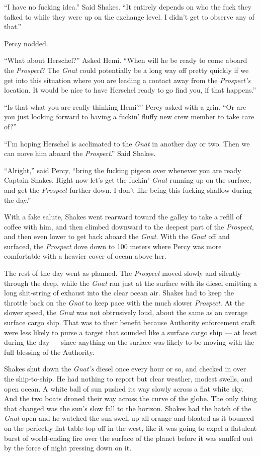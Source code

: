 \documentclass[]{scrbook}
\begin{document}
``I have no fucking idea.'' Said Shakes. ``It entirely depends on who
the fuck they talked to while they were up on the exchange level. I
didn't get to observe any of that.''

Percy nodded.

``What about Herschel?'' Asked Hemi. ``When will he be ready to come
aboard the \emph{Prospect}? The \emph{Gnat} could potentially be a long
way off pretty quickly if we get into this situation where you are
leading a contact away from the \emph{Prospect's} location. It would be
nice to have Herschel ready to go find you, if that happens.''

``Is that what you are really thinking Hemi?'' Percy asked with a grin.
``Or are you just looking forward to having a fuckin' fluffy new crew
member to take care of?''

``I'm hoping Herschel is acclimated to the \emph{Gnat} in another day or
two. Then we can move him aboard the \emph{Prospect}.'' Said Shakes.

``Alright,'' said Percy, ``bring the fucking pigeon over whenever you
are ready Captain Shakes. Right now let's get the fuckin' \emph{Gnat}
running up on the surface, and get the \emph{Prospect} further down. I
don't like being this fucking shallow during the day.''

With a fake salute, Shakes went rearward toward the galley to take a
refill of coffee with him, and then climbed downward to the deepest part
of the \emph{Prospect}, and then even lower to get back aboard the
\emph{Gnat}. With the \emph{Gnat} off and surfaced, the \emph{Prospect}
dove down to 100 meters where Percy was more comfortable with a heavier
cover of ocean above her.

The rest of the day went as planned. The \emph{Prospect} moved slowly
and silently through the deep, while the \emph{Gnat} ran just at the
surface with its diesel emitting a long shit-string of exhaust into the
clear ocean air. Shakes had to keep the throttle back on the \emph{Gnat}
to keep pace with the much slower \emph{Prospect}. At the slower speed,
the \emph{Gnat} was not obtrusively loud, about the same as an average
surface cargo ship. That was to their benefit because Authority
enforcement craft were less likely to purse a target that sounded like a
surface cargo ship --- at least during the day --- since anything on the
surface was likely to be moving with the full blessing of the Authority.

Shakes shut down the \emph{Gnat's} diesel once every hour or so, and
checked in over the ship-to-ship. He had nothing to report but clear
weather, modest swells, and open ocean. A white ball of sun pushed its
way slowly across a flat white sky. And the two boats droned their way
across the curve of the globe. The only thing that changed was the sun's
slow fall to the horizon. Shakes had the hatch of the \emph{Gnat} open
and he watched the sun swell up all orange and bloated as it bounced on
the perfectly flat table-top off in the west, like it was going to expel
a flatulent burst of world-ending fire over the surface of the planet
before it was snuffed out by the force of night pressing down on it.
\end{document}
